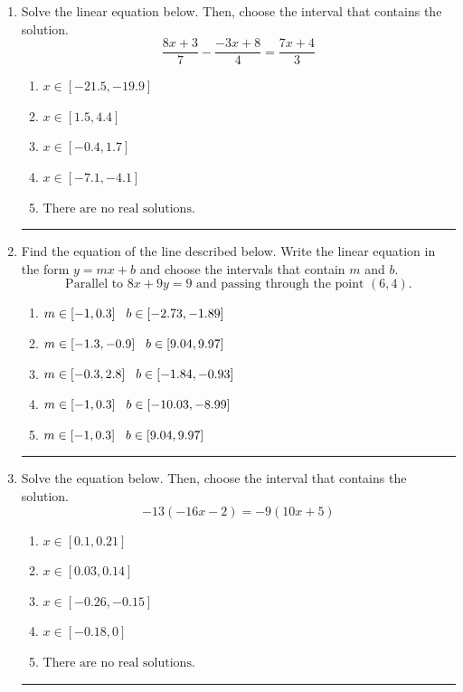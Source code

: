 \documentclass[14pt]{extbook}
\newcommand{\litem}[1]{\item#1\hspace*{-1cm}\rule{\textwidth}{0.4pt}}
\begin{document}
\begin{enumerate}
{\begin{enumerate}[label=\Alph*.]
\end{enumerate} }
\litem{
Solve the linear equation below. Then, choose the interval that contains the solution.\[ \frac{8x + 3}{7} - \frac{-3x + 8}{4} = \frac{7x + 4}{3} \]\begin{enumerate}[label=\Alph*.]
\item \( x \in [-21.5, -19.9] \)
\item \( x \in [1.5, 4.4] \)
\item \( x \in [-0.4, 1.7] \)
\item \( x \in [-7.1, -4.1] \)
\item \( \text{There are no real solutions.} \)

\end{enumerate} }
\litem{
Find the equation of the line described below. Write the linear equation in the form $ y=mx+b $ and choose the intervals that contain $m$ and $b$.\[ \text{Parallel to } 8 x + 9 y = 9 \text{ and passing through the point } (6, 4). \]\begin{enumerate}[label=\Alph*.]
\item \( m \in [-1, 0.3] \hspace*{3mm} b \in [-2.73, -1.89] \)
\item \( m \in [-1.3, -0.9] \hspace*{3mm} b \in [9.04, 9.97] \)
\item \( m \in [-0.3, 2.8] \hspace*{3mm} b \in [-1.84, -0.93] \)
\item \( m \in [-1, 0.3] \hspace*{3mm} b \in [-10.03, -8.99] \)
\item \( m \in [-1, 0.3] \hspace*{3mm} b \in [9.04, 9.97] \)

\end{enumerate} }
\litem{
Solve the equation below. Then, choose the interval that contains the solution.\[ -13(-16x -2) = -9(10x + 5) \]\begin{enumerate}[label=\Alph*.]
\item \( x \in [0.1, 0.21] \)
\item \( x \in [0.03, 0.14] \)
\item \( x \in [-0.26, -0.15] \)
\item \( x \in [-0.18, 0] \)
\item \( \text{There are no real solutions.} \)


\end{enumerate}}
\end{enumerate}
\end{document}
